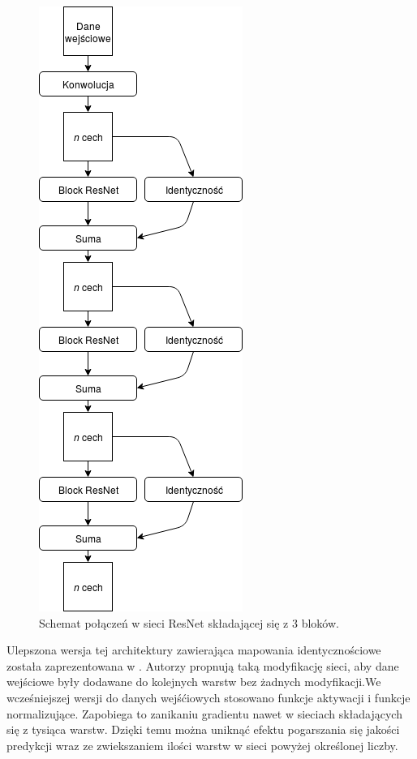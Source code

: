 \documentclass[a4paper,11pt,twoside]{report}
\theoremstyle{definition}
\begin{document}
\begin{figure}[h!]
	\centering
	\includegraphics[scale=0.7]{resnet}
	\caption{Schemat połączeń w sieci ResNet składającej się z 3 bloków.}
\end{figure}

Ulepszona wersja tej architektury zawierająca mapowania identycznościowe została zaprezentowana w \cite{preResnet}. Autorzy propnują taką modyfikację sieci, aby dane wejściowe były dodawane do kolejnych warstw bez żadnych modyfikacji.We wcześniejszej wersji do danych wejśćiowych stosowano funkcje aktywacji i funkcje normalizujące. Zapobiega to zanikaniu gradientu nawet w sieciach składających się z tysiąca warstw. Dzięki temu można uniknąć efektu pogarszania się jakości predykcji wraz ze zwiekszaniem ilości warstw w sieci powyżej określonej liczby.
\end{document}
